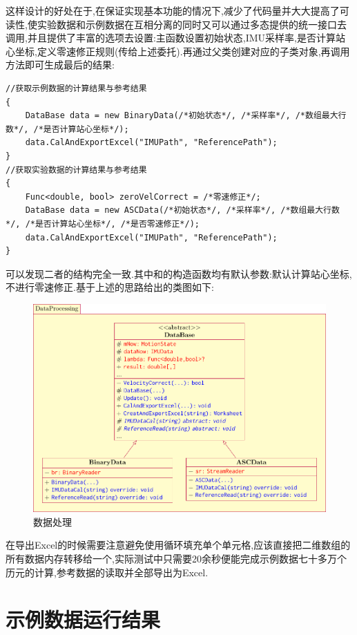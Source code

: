 \documentclass[10pt,a4paper]{ctexart}
\begin{document}
这样设计的好处在于,在保证实现基本功能的情况下,减少了代码量并大大提高了可读性,使实验数据和示例数据在互相分离的同时又可以通过多态提供的统一接口去调用,并且提供了丰富的选项去设置:主函数设置初始状态,\textsf{IMU}采样率,是否计算站心坐标,定义零速修正规则(传给上述委托).再通过父类创建对应的子类对象,再调用方法即可生成最后的结果:
\newpage
\begin{lstlisting}[caption=主函数代码]
//获取示例数据的计算结果与参考结果
{
    DataBase data = new BinaryData(/*初始状态*/, /*采样率*/, /*数组最大行数*/, /*是否计算站心坐标*/);
    data.CalAndExportExcel("IMUPath", "ReferencePath");
}
//获取实验数据的计算结果与参考结果
{
    Func<double, bool> zeroVelCorrect = /*零速修正*/;
    DataBase data = new ASCData(/*初始状态*/, /*采样率*/, /*数组最大行数*/, /*是否计算站心坐标*/, /*是否零速修正*/);
    data.CalAndExportExcel("IMUPath", "ReferencePath");
}
\end{lstlisting}
可以发现二者的结构完全一致.其中和的构造函数均有默认参数:默认计算站心坐标,不进行零速修正.基于上述的思路给出的类图如下:
\begin{figure}[H]
\centering
\includegraphics[scale=0.9]{Figures/DataBaseClass.pdf}
\caption{数据处理}
\label{fig:DataProcessing}
\end{figure}
在导出\textsf{Excel}的时候需要注意避免使用循环填充单个单元格,应该直接把二维数组的所有数据内存转移给一个,实际测试中只需要20余秒便能完成示例数据七十多万个历元的计算,参考数据的读取并全部导出为\textsf{Excel}.

\section{示例数据运行结果}
\end{document}

